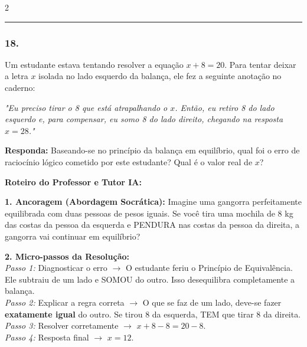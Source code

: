 \begin{multicols*}{2}
\par\vspace{\espacoQuestao}

\noindent\textcolor{CorLinha}{\rule{\linewidth}{0.5pt}}
\par\vspace{\espacoPreQuestao}
\subsubsection*{18.} 
\begin{enunciadoLiteral}
Um estudante estava tentando resolver a equação $ x + 8 = 20 $. Para tentar deixar a letra $x$ isolada no lado esquerdo da balança, ele fez a seguinte anotação no caderno:

\textit{"Eu preciso tirar o 8 que está atrapalhando o $x$. Então, eu retiro 8 do lado esquerdo e, para compensar, eu somo 8 do lado direito, chegando na resposta $ x = 28 $."}

\begin{boxresponda}
\textbf{Responda:} Baseando-se no princípio da balança em equilíbrio, qual foi o erro de raciocínio lógico cometido por este estudante? Qual é o valor real de $x$?
\end{boxresponda}
\end{enunciadoLiteral}

\ifgabarito
    \begin{tcolorbox}[colback=CorTitUm!5, colframe=CorTitUm, boxrule=1pt, arc=4pt, left=6pt, right=6pt, top=6pt, bottom=6pt]
    \small\textbf{\textcolor{CorTitUm}{Roteiro do Professor e Tutor IA:}}\par\vspace{0.1cm}
    \color{CinzaEscuro}
    \textbf{1. Ancoragem (Abordagem Socrática):} Imagine uma gangorra perfeitamente equilibrada com duas pessoas de pesos iguais. Se você tira uma mochila de 8 kg das costas da pessoa da esquerda e PENDURA nas costas da pessoa da direita, a gangorra vai continuar em equilíbrio?\par\vspace{0.1cm}
    
    \textbf{2. Micro-passos da Resolução:}\\
    \textit{Passo 1:} Diagnosticar o erro $\rightarrow$ O estudante feriu o Princípio de Equivalência. Ele subtraiu de um lado e SOMOU do outro. Isso desequilibra completamente a balança.\\
    \textit{Passo 2:} Explicar a regra correta $\rightarrow$ O que se faz de um lado, deve-se fazer \textbf{exatamente igual} do outro. Se tirou 8 da esquerda, TEM que tirar 8 da direita.\\
    \textit{Passo 3:} Resolver corretamente $\rightarrow$ $ x + 8 - 8 = 20 - 8 $.\\
    \textit{Passo 4:} Resposta final $\rightarrow$ $ x = 12 $.\par\vspace{0.1cm}
    

\end{tcolorbox}
\end{multicols*}
